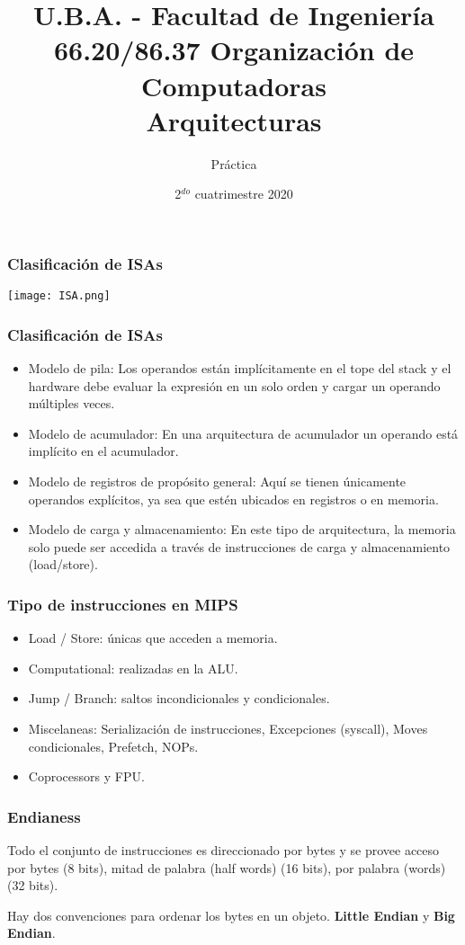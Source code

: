 \documentclass{beamer}
\title[66.20/86.37]{U.B.A. - Facultad de Ingeniería\\\vspace{0.25cm} 66.20/86.37 Organización de Computadoras
\\Arquitecturas}
\author{Práctica}
\date{2$^{do}$ cuatrimestre 2020}
\begin{document}
\begin{frame}
\titlepage %
\end{frame}

\begin{frame}
\frametitle{Clasificación de ISAs}
\begin{center}
 \texttt{[image: ISA.png]}
\end{center}
\end{frame}

\begin{frame}
 \frametitle{Clasificación de ISAs}
 \begin{itemize}
  \item Modelo de pila: 
Los operandos están implícitamente en el tope del stack y el hardware debe evaluar la expresión en un solo orden y cargar un operando múltiples veces.
\item Modelo de acumulador: 
En una arquitectura de acumulador un operando está implícito en el acumulador.
\item Modelo de registros de propósito general: 
Aquí se tienen únicamente operandos explícitos, ya sea que estén ubicados en registros o en memoria.
\item Modelo de carga y almacenamiento: 
En este tipo de arquitectura, la memoria solo puede ser accedida a través de instrucciones de carga y almacenamiento (load/store). 
 \end{itemize}
\end{frame}


\begin{frame}
 \frametitle{Tipo de instrucciones en MIPS}
 \begin{itemize}
  \item Load / Store: únicas que acceden a memoria.
  \item Computational: realizadas en la ALU.
  \item Jump / Branch: saltos incondicionales y condicionales.
  \item Miscelaneas: Serialización de instrucciones, Excepciones (syscall), Moves condicionales, Prefetch, NOPs.
  \item Coprocessors y FPU.
 \end{itemize}
\end{frame}



\begin{frame}
 \frametitle{Endianess}
Todo el conjunto de instrucciones es direccionado por bytes y se provee acceso por bytes (8 bits), mitad de palabra (half words) (16 bits), por palabra (words) (32 bits).

\bigskip

Hay dos convenciones para ordenar los bytes en un objeto. \textbf{Little Endian} y \textbf{Big Endian}.
 \end{frame}
 
\end{document}
